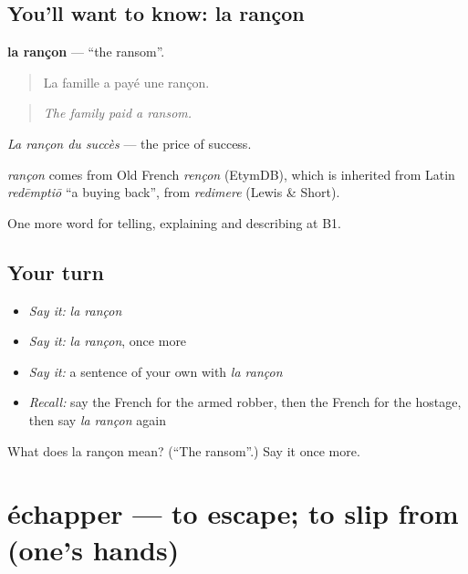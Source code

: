 \subsection*{You'll want to know: la rançon}
\textbf{la rançon} — \textquotedblleft{}the ransom\textquotedblright{}.

\begin{quote}
La famille a payé une rançon.
\end{quote}

\begin{quote}
\emph{The family paid a ransom.}
\end{quote}

\emph{La rançon du succès} — the price of success.

\begin{cousinweb}
\emph{rançon} comes from Old French \emph{rençon} (EtymDB), which is inherited from Latin \emph{redēmptiō} \textquotedblleft{}a buying back\textquotedblright{}, from \emph{redimere} (Lewis \& Short).
\end{cousinweb}

\begin{grammarlens}[title={What you've built}]
One more word for telling, explaining and describing at B1.
\end{grammarlens}

\subsection*{Your turn}
\begin{itemize}
\raggedright
  \item \emph{Say it:} \emph{la rançon}
  \item \emph{Say it:} \emph{la rançon}, once more
  \item \emph{Say it:} a sentence of your own with \emph{la rançon}
  \item \emph{Recall:} say the French for the armed robber, then the French for the hostage, then say \emph{la rançon} again
\end{itemize}

\begin{tcolorbox}[breakable,colback=teal!4,colframe=teal!35!black,title={Before you move on}]
What does la rançon mean? (\textquotedblleft{}The ransom\textquotedblright{}.) Say it once more.
\end{tcolorbox}
\section[échapper]{échapper — to escape; to slip from (one's hands)}

